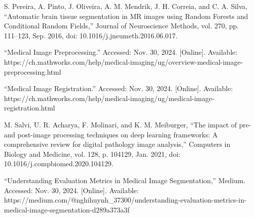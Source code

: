 \begin{thebibliography}{00}
	 S. Pereira, A. Pinto, J. Oliveira, A. M. Mendrik, J. H. Correia, and C. A. Silva, “Automatic brain tissue segmentation in MR images using Random Forests and Conditional Random Fields,” Journal of Neuroscience Methods, vol. 270, pp. 111–123, Sep. 2016, doi: 10.1016/j.jneumeth.2016.06.017.
	
	 “Medical Image Preprocessing.” Accessed: Nov. 30, 2024. [Online]. Available: https://ch.mathworks.com/help/medical-imaging/ug/overview-medical-image-preprocessing.html
	
	 “Medical Image Registration.” Accessed: Nov. 30, 2024. [Online]. Available: https://ch.mathworks.com/help/medical-imaging/ug/medical-image-registration.html
	
	 M. Salvi, U. R. Acharya, F. Molinari, and K. M. Meiburger, “The impact of pre- and post-image processing techniques on deep learning frameworks: A comprehensive review for digital pathology image analysis,” Computers in Biology and Medicine, vol. 128, p. 104129, Jan. 2021, doi: 10.1016/j.compbiomed.2020.104129.
	
	 “Understanding Evaluation Metrics in Medical Image Segmentation,” Medium. Accessed: Nov. 30, 2024. [Online]. Available: https://medium.com/@nghihuynh\_37300/understanding-evaluation-metrics-in-medical-image-segmentation-d289a373a3f
	

\end{thebibliography}





